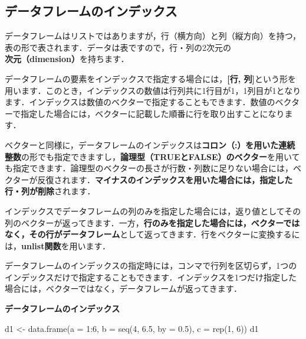 \documentclass[
  letterpaper,
  DIV=11,
  numbers=noendperiod]{scrreprt}
\newenvironment{Shaded}{\begin{snugshade}}{\end{snugshade}}
\newcommand{\AttributeTok}[1]{\textcolor[rgb]{0.40,0.45,0.13}{#1}}
\newcommand{\DecValTok}[1]{\textcolor[rgb]{0.68,0.00,0.00}{#1}}
\newcommand{\FloatTok}[1]{\textcolor[rgb]{0.68,0.00,0.00}{#1}}
\newcommand{\FunctionTok}[1]{\textcolor[rgb]{0.28,0.35,0.67}{#1}}
\newcommand{\NormalTok}[1]{\textcolor[rgb]{0.00,0.23,0.31}{#1}}
\newcommand{\OtherTok}[1]{\textcolor[rgb]{0.00,0.23,0.31}{#1}}
\newcommand{\SpecialCharTok}[1]{\textcolor[rgb]{0.37,0.37,0.37}{#1}}
\begin{document}
\hypertarget{ux30c7ux30fcux30bfux30d5ux30ecux30fcux30e0ux306eux30a4ux30f3ux30c7ux30c3ux30afux30b9-1}{%
\subsection{データフレームのインデックス}\label{ux30c7ux30fcux30bfux30d5ux30ecux30fcux30e0ux306eux30a4ux30f3ux30c7ux30c3ux30afux30b9-1}}

データフレームはリストではありますが，行（横方向）と列（縦方向）を持つ，表の形で表されます．データは表ですので，行・列の2次元の\textbf{次元（dimension）}を持ちます．

データフレームの要素をインデックスで指定する場合には，\textbf{{[}行,
列{]}}という形を用います．このとき，インデックスの数値は行列共に1行目が1，1列目が1となります．インデックスは数値のベクターで指定することもできます．数値のベクターで指定した場合には，ベクターに記載した順番に行を取り出すことになります．

ベクターと同様に，データフレームのインデックスは\textbf{コロン（:）を用いた連続整数}の形でも指定できますし，\textbf{論理型（TRUEとFALSE）のベクター}を用いても指定できます．論理型のベクターの長さが行数・列数に足りない場合には，ベクターが反復されます．\textbf{マイナスのインデックスを用いた場合には，指定した行・列が削除}されます．

インデックスでデータフレームの列のみを指定した場合には，返り値としてその列のベクターが返ってきます．一方，\textbf{行のみを指定した場合には，ベクターではなく，その行がデータフレーム}として返ってきます．行をベクターに変換するには，\textbf{unlist関数}を用います．

データフレームのインデックスの指定時には，コンマで行列を区切らず，1つのインデックスだけで指定することもできます．インデックスを1つだけ指定した場合には，ベクターではなく，データフレームが返ってきます．

\textbf{データフレームのインデックス}

\begin{Shaded}
\begin{Highlighting}[]
\NormalTok{d1 }\OtherTok{\textless{}{-}} \FunctionTok{data.frame}\NormalTok{(}\AttributeTok{a =} \DecValTok{1}\SpecialCharTok{:}\DecValTok{6}\NormalTok{, }\AttributeTok{b =} \FunctionTok{seq}\NormalTok{(}\DecValTok{4}\NormalTok{, }\FloatTok{6.5}\NormalTok{, }\AttributeTok{by =} \FloatTok{0.5}\NormalTok{), }\AttributeTok{c =} \FunctionTok{rep}\NormalTok{(}\DecValTok{1}\NormalTok{, }\DecValTok{6}\NormalTok{))}
\NormalTok{d1}
\end{Highlighting}
\end{Shaded}
\end{document}

